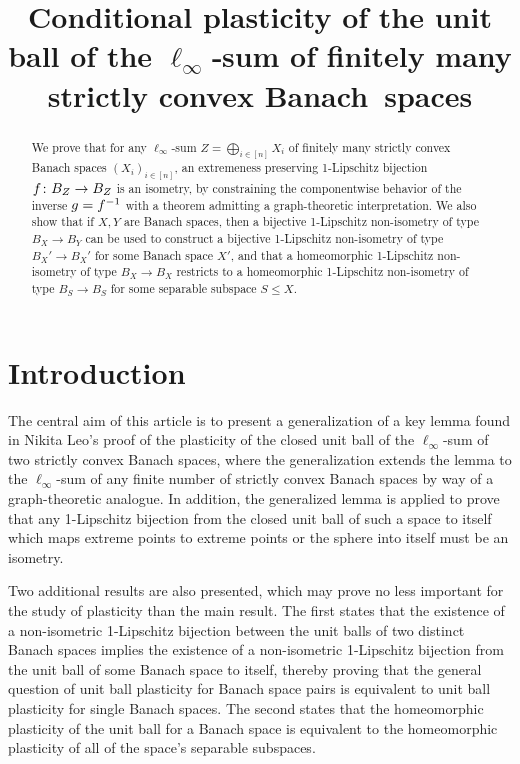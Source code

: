 \documentclass{amsart}
\title{Conditional plasticity of the unit ball of the \(\ell_\infty\)‑sum of finitely many strictly convex Banach~spaces}
\theoremstyle{definition}
\begin{document}
\begin{abstract}
    We prove that for any $\ell_\infty$-sum $Z = \bigoplus_{i \in [n]} X_i$ of finitely many strictly
    convex Banach spaces $(X_i)_{i \in [n]}$, an extremeness preserving 1-Lipschitz bijection
    $f\colon B_Z \to B_Z$ is an isometry, by constraining the componentwise behavior of the inverse
    $g=f^{-1}$ with a theorem admitting a graph-theoretic interpretation.
    We also show that if $X, Y$ are Banach spaces, then a bijective 1-Lipschitz non-isometry of
    type $B_X \to B_Y$ can be used to construct a bijective 1-Lipschitz non-isometry of type
    $B_X' \to B_X'$ for some Banach space $X'$, and that a homeomorphic 1-Lipschitz non-isometry of
    type $B_X \to B_X$ restricts to a homeomorphic 1-Lipschitz non-isometry of type
    $B_S \to B_S$ for some separable subspace $S \leq X$.
\end{abstract}

\maketitle

\section{Introduction}

The central aim of this article is to present a generalization of a key lemma
found in Nikita Leo's proof of the plasticity of the closed unit ball of
the $\ell_\infty$-sum of two strictly convex Banach spaces, where the generalization
extends the lemma to the $\ell_\infty$-sum of any finite number of strictly convex Banach
spaces by way of a graph-theoretic analogue. In addition, the generalized lemma is applied to prove that any 1-Lipschitz bijection from
the closed unit ball of such a space to itself
which maps extreme points to extreme points
or the sphere into itself must be an isometry.

Two additional results are also presented, which may prove no less important for the study of plasticity than the main result. The first states that the existence of a non-isometric 1-Lipschitz bijection between the unit balls of two distinct Banach spaces implies the existence of a non-isometric 1-Lipschitz bijection from the unit ball of some Banach space to itself, thereby proving that the general question of unit ball plasticity for Banach space pairs is equivalent to unit ball plasticity for single Banach spaces. The second states that the homeomorphic plasticity of the unit ball for a Banach space is equivalent to the homeomorphic plasticity of all of the space's separable subspaces.
\end{document}
